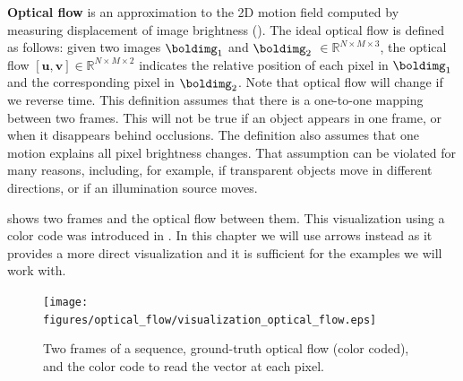 {\bf Optical flow} is an approximation to the 2D motion field computed by measuring displacement of image brightness (\fig{\ref{fig:visualization_optical_flow}}). The ideal optical flow is defined as follows: given two images $\boldimg_1$ and $\boldimg_2$ $\in \mathbb{R}^{N \times M \times 3}$, the optical flow $\left[ \mathbf{u}, \mathbf{v} \right] \in \mathbb{R}^{N \times M \times 2}$ indicates the relative position of each pixel in $\boldimg_1$ and the corresponding pixel in $\boldimg_2$. Note that optical flow will change if we reverse time. This definition assumes that there is a one-to-one mapping between two frames. This will not be true if an object appears in one frame, or when it disappears behind occlusions. The definition also assumes that one motion explains all pixel brightness changes. That assumption can be violated for many reasons, including, for example, if transparent objects move in different directions, or if an illumination source moves.


\Fig{\ref{fig:visualization_optical_flow}} shows two frames and the optical flow between them. This visualization using a color code was introduced in \cite{Baker2007}. In this chapter we will use arrows instead as it provides a more direct visualization and it is sufficient for the examples we will work with.

\begin{figure}[t]
    \centerline{
        \texttt{[image: figures/optical\_flow/visualization\_optical\_flow.eps]}}
    \caption{Two frames of a sequence, ground-truth optical flow (color coded), and the color code to read the vector at each pixel.}
    \label{fig:visualization_optical_flow}
\end{figure}





